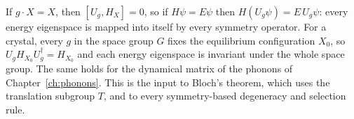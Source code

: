 \begin{fact}
If $g\cdot X = X$, then $[U_g, H_X] = 0$, so if $H\psi = E\psi$ then $H(U_g\psi) = E\,U_g\psi$: every energy eigenspace is mapped into itself by every symmetry operator. For a crystal, every $g$ in the space group $G$ fixes the equilibrium configuration $X_0$, so $U_gH_{X_0}U_g^\dagger = H_{X_0}$ and each energy eigenspace is invariant under the whole space group. The same holds for the dynamical matrix of the phonons of Chapter~\ref{ch:phonons}. This is the input to Bloch's theorem, which uses the translation subgroup $T$, and to every symmetry-based degeneracy and selection rule.
\end{fact}
